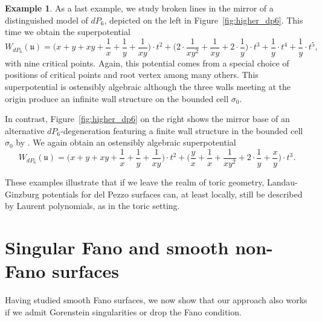\documentclass[11pt,letter]{amsart}
\theoremstyle{definition}
\newtheorem{example}[theorem]{Example}
\theoremstyle{remark}
\numberwithin{equation}{section}
\numberwithin{figure}{section}
\newcommand {\fou}  {\mathfrak{u}}
\begin{document}
\begin{example}
As a last example, we study broken lines in the mirror of a
distinguished model of $dP_6$, depicted on the left in
Figure~\ref{fig:higher_dp6}. This time we obtain the superpotential
\[
W_{dP_6}(\fou) = \Big(x +  y +  xy + \frac{1}{x} + \frac{1}{y}
+ \frac{1}{xy}\Big) \cdot t^2 + \Big(2 \cdot \frac{1}{xy^2} + \frac{1}{xy} +
2\cdot \frac{1}{y}\Big) \cdot t^3 + \frac{1}{y} \cdot t^4 +
\frac{1}{y} \cdot t^5,
\]
with nine critical points. Again, this potential comes from a special choice of
positions of critical points and root vertex among many others. This
superpotential is ostensibly algebraic although the three walls meeting at the
origin produce an infinite wall structure on the bounded cell $\sigma_0$.

In contrast, Figure~\ref{fig:higher_dp6} on the right shows the mirror base of an
alternative $dP_6$-degeneration featuring a finite wall structure in the bounded
cell $\sigma_0$ by \cite[Expl.\,4.3]{Invitation}. We again obtain an ostensibly
algebraic superpotential
\[
W_{dP_6}(\fou) = \Big(x +  y +  xy +
\frac{1}{x} + \frac{1}{y} + \frac{1}{xy}\Big) \cdot t^2 + \Big(\frac{y}{x} +
\frac{1}{x} + \frac{1}{xy^2} + 2\cdot \frac{1}{y} + \frac{x}{y}\Big)
\cdot t^3.
\]
\end{example}

These examples illustrate that if we leave the realm of toric
geometry, Landau-Ginzburg potentials for del Pezzo surfaces can, at
least locally, still be described by Laurent polynomials, as in the
toric setting.


\section{Singular Fano and smooth non-Fano surfaces}

Having studied smooth Fano surfaces, we now show that our approach
also works if we admit Gorenstein singularities or drop the Fano
condition.

\end{document}
